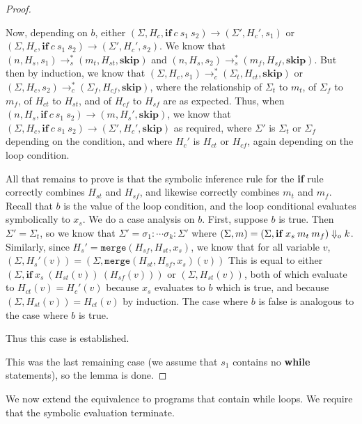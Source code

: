 \begin{proof}
\begin{itemize}
    Now, depending on $b$,
    either
    $(\Sigma, H_c, \mathbf{if}\:c\:s_1\:s_2) \to (\Sigma', H_c', s_1)$
    or
    $(\Sigma, H_c, \mathbf{if}\:c\:s_1\:s_2) \to (\Sigma', H_c', s_2)$.
    We know that
    $(n, H_s, s_1) \to_s^* (m_t, H_{st}, \mathbf{skip})$
    and
    $(n, H_s, s_2) \to_s^* (m_f, H_{sf}, \mathbf{skip})$.
    But then by induction, we know that
    $(\Sigma, H_c, s_1) \to_c^* (\Sigma_t, H_{ct}, \mathbf{skip})$
    or
    $(\Sigma, H_c, s_2) \to_c^* (\Sigma_f, H_{cf}, \mathbf{skip})$,
    where the relationship of $\Sigma_t$ to $m_t$, of $\Sigma_f$ to
    $m_f$, of $H_{ct}$ to $H_{st}$, and of $H_{cf}$ to $H_{sf}$ are
    as expected.
    Thus, when
    $(n, H_s, \mathbf{if}\:c\:s_1\:s_2) \to (m, H_s', \mathbf{skip})$,
    we know that
    $(\Sigma, H_c, \mathbf{if}\:c\:s_1\:s_2) \to (\Sigma', H_c', \mathbf{skip})$
    as required, where $\Sigma'$ is $\Sigma_t$ or $\Sigma_f$ depending
    on the condition, and where $H_c'$ is $H_{ct}$ or $H_{cf}$, again
    depending on the loop condition.

    All that remains to prove is that the symbolic inference rule for
    the \textbf{if} rule correctly combines $H_{st}$ and $H_{sf}$, and
    likewise correctly combines $m_t$ and $m_f$.
    Recall that $b$ is the value of the loop condition, and the loop
    conditional evaluates symbolically to $x_s$.
    We do a case analysis on $b$.
    First, suppose $b$ is true.  Then $\Sigma' = \Sigma_t$, so we know
    that $\Sigma' = \sigma_1:\dotsb\sigma_k:\Sigma'$ where
    $(\Sigma, m) = (\Sigma, \mathbf{if}\:x_s\:m_t\:m_f) \Downarrow_o k$.
    Similarly, since $H_s' = \mathtt{merge}(H_{sf}, H_{st}, x_s)$,
    we know that for all variable $v$,
    $(\Sigma, H_s'(v)) = (\Sigma, \mathtt{merge}(H_{st}, H_{sf}, x_s)(v))$
    This is equal to either $(\Sigma, \mathbf{if}\:x_s\:(H_{st}(v))\:(H_{sf}(v)))$
    or $(\Sigma, H_{st}(v))$, both of which evaluate to $H_{ct}(v) = H_c'(v)$
    because $x_s$ evaluates to $b$ which is true, and because
    $(\Sigma, H_{st}(v)) = H_{ct}(v)$ by induction.
    The case where $b$ is false is analogous to the case where $b$ is
    true.

    Thus this case is established.
  \end{itemize}

  This was the last remaining case (we assume that $s_1$ contains no
  \textbf{while} statements), so the lemma is done.
\end{proof}

We now extend the equivalence to programs that contain while loops.
We require that the symbolic evaluation terminate.

